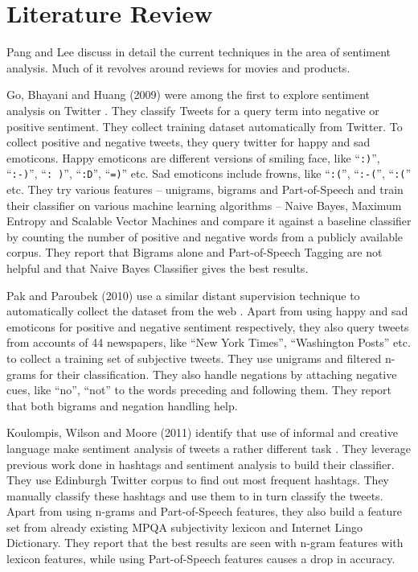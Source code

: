 \section{Literature Review}

Pang and Lee discuss in detail the current techniques in the area of sentiment
analysis. Much of it revolves around reviews for movies and products.


Go, Bhayani and Huang (2009) were among the first to explore sentiment analysis
on Twitter \cite{GBH}. They classify Tweets for a query term into negative or
positive sentiment. They collect training dataset automatically from Twitter. To
collect positive and negative tweets, they query twitter for happy and sad
emoticons. Happy emoticons are different versions of smiling face, like
``\texttt{:)}'', ``\texttt{:-)}'', ``\texttt{: )}'', ``\texttt{:D}'',
``\texttt{=)}'' etc. Sad emoticons include frowns, like ``\texttt{:(}'',
``\texttt{:-(}'', ``\texttt{:(}'' etc. They try various features – unigrams,
bigrams and Part-of-Speech and train their classifier on various machine
learning algorithms – Naive Bayes, Maximum Entropy and Scalable Vector Machines
and compare it against a baseline classifier by counting the number of positive
and negative words from a publicly available corpus. They report that Bigrams
alone and Part-of-Speech Tagging are not helpful and that Naive Bayes Classifier
gives the best results.

Pak and Paroubek (2010) use a similar distant supervision technique to
automatically collect the dataset from the web \cite{PP}. Apart from using happy
and sad emoticons for positive and negative sentiment respectively, they also
query tweets from accounts of 44 newspapers, like “New York Times”, “Washington
Posts” etc. to collect a training set of subjective tweets. They use unigrams
and filtered n-grams for their classification. They also handle negations by
attaching negative cues, like “no”, “not” to the words preceding and following
them. They report that both bigrams and negation handling help.

Koulompis, Wilson and Moore (2011) identify that use of informal and creative
language make sentiment analysis of tweets a rather different task \cite{KWM}.
They leverage previous work done in hashtags and sentiment analysis to build
their classifier. They use Edinburgh Twitter corpus to find out most frequent
hashtags. They manually classify these hashtags and use them to in turn classify
the tweets. Apart from using n-grams and Part-of-Speech features, they also
build a feature set from already existing MPQA subjectivity lexicon and Internet
Lingo Dictionary. They report that the best results are seen with n-gram
features with lexicon features, while using Part-of-Speech features causes a
drop in accuracy.

